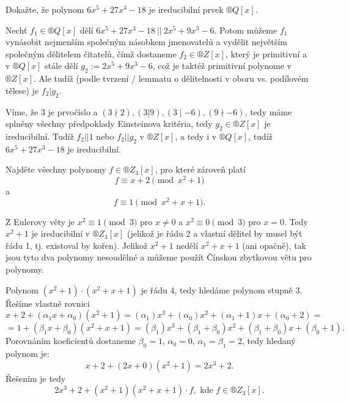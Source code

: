 \documentclass[12pt]{article}                   %
\begin{document}
    \begin{priklad}[4.1]
        Dokažte, že polynom $6x^5 + 27x^3 - 18$ je ireducibilní prvek $®Q[x]$.

        \begin{dukazin}
            Nechť $f_1 \in ®Q[x]$ dělí $6x^5 + 27x^3 - 18\ ||\ 2x^5 + 9x^3 - 6$. Potom můžeme $f_1$ vynásobit nejmenším společným násobkem jmenovatelů a vydělit největším společným dělitelem čitatelů, čímž dostaneme $f_2 \in ®Z[x]$, který je primitivní a v $®Q[x]$ stále dělí $g_2 := 2x^5 + 9x^3 -6$, což je taktéž primitivní polynome v $®Z[x]$. Ale tudíž (podle tvrzení / lemmatu o dělitelnosti v oboru vs. podílovém tělese) je $f_2|g_2$.

            Víme, že 3 je prvočíslo a $(3\nmid2), (3|9), (3\mid-6), (9\nmid-6)$, tedy máme splněny všechny předpoklady Einsteinova kritéria, tedy $g_2 \in ®Z[x]$ je ireducibilní. Tudíž $f_2 || 1$ nebo $f_2 || g_2$ v $®Z[x]$, a tedy i v $®Q[x]$, tudíž $6x^5 + 27x^3 - 18$ je ireducibilní.
        \end{dukazin}
    \end{priklad}

    \begin{priklad}[4.2]
        Najděte všechny polynomy $f \in ®Z_3[x]$, pro které zároveň platí
        $$ f ≡ x + 2 \pmod{x^2 + 1} $$
        a
        $$ f ≡ 1 \pmod{x^2 + x + 1}. $$ 

        \begin{reseni}
            Z Eulerovy věty je $x^2 ≡ 1 \pmod{3}$ pro $x ≠ 0$ a $x^2 ≡ 0 \pmod{3}$ pro $x=0$. Tedy $x^2 + 1$ je ireducibilní v $®Z_3[x]$ (jelikož je řádu 2 a vlastní dělitel by musel být řádu 1, tj. existoval by kořen). Jelikož $x^2 + 1$ nedělí $x^2 + x + 1$ (ani opačně), tak jsou tyto dva polynomy nesoudělné a můžeme použít Čínskou zbytkovou větu pro polynomy.

            Polynom $(x^2 + 1)·(x^2 + x + 1)$ je řádu 4, tedy hledáme polynom stupně $3$. Řešíme vlastně rovnici
            $$ x + 2 + (\alpha_1x + \alpha_0)(x^2 + 1) = (\alpha_1)x^3 + (\alpha_0)x^2 + (\alpha_1 + 1)x + (\alpha_0 + 2) = $$ 
            $$ = 1 + (\beta_1x + \beta_0)(x^2 + x + 1) = (\beta_1)x^3 + (\beta_1 + \beta_0)x^2 + (\beta_1 + \beta_0)x + (\beta_0 + 1). $$
            Porovnáním koeficientů dostaneme $\beta_0 = 1$, $\alpha_0 = 0$, $\alpha_1 = \beta_1 = 2$, tedy hledaný polynom je:
            $$ x + 2 + (2x + 0)(x^2 + 1) = 2x^3 + 2. $$
            Řešením je tedy
            $$ 2x^3 + 2 + (x^2 + 1)(x^2 + x + 1)·f, \text{ kde } f \in ®Z_3[x]. $$
        \end{reseni}
    \end{priklad}
\end{document}
